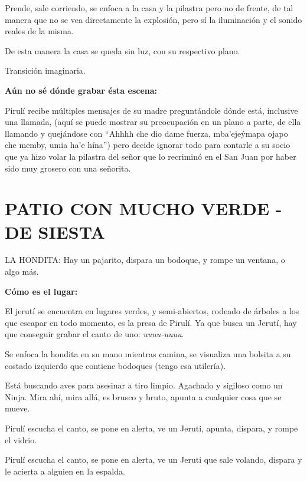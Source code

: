 \documentclass[12pt, a4paper]{article}
\begin{document}
  Prende, sale corriendo, se enfoca a la casa y la pilastra pero no de frente, de tal manera que no se vea directamente la explosión, 
  pero sí la iluminación y el sonido reales de la misma.

  De esta manera la casa se queda sin luz, con su respectivo plano.   %

  \vspace{7pt}
  Transición imaginaria.
  \vspace{70pt}

  \textbf{Aún no sé dónde grabar ésta escena:}
  \vspace{7pt}

  Pirulí recibe múltiples mensajes de su madre preguntándole dónde está, inclusive una llamada, (aquí se puede mostrar su preocupación en un plano
  a parte, de ella llamando y quejándose con ``Ahhhh che dio dame fuerza, mba'ejeýmapa ojapo che memby, umia ha'e hína'') pero decide 
  ignorar todo para contarle a su socio que ya hizo volar la pilastra del señor que lo recriminó en el San Juan por haber sido muy grosero 
  con una señorita.

  \section{PATIO CON MUCHO VERDE - DE SIESTA}
  LA HONDITA: Hay un pajarito, dispara un bodoque, y rompe un ventana, o algo más.

  \vspace{7pt}
  \textbf{Cómo es el lugar:}

  El jerutí se encuentra en lugares verdes, y semi-abiertos, rodeado de árboles a los que escapar en todo momento, es la presa de Pirulí.
  Ya que busca un Jerutí, hay que conseguir grabar el canto de uno: \textit{uuuu-uuuu}.

  Se enfoca la hondita en su mano mientras camina, se visualiza una bolsita a su costado izquierdo que contiene bodoques (tengo
  esa utilería).

  Está buscando aves para asesinar a tiro limpio. Agachado y sigiloso como un Ninja. Mira ahí, mira allá, es brusco y bruto,
  apunta a cualquier cosa que se mueve.

  Pirulí escucha el canto, se pone en alerta, ve un Jeruti, apunta, dispara, y rompe el vidrio.

  Pirulí escucha el canto, se pone en alerta, ve un Jeruti que sale volando, dispara y le acierta a alguien en la espalda.
\end{document}
